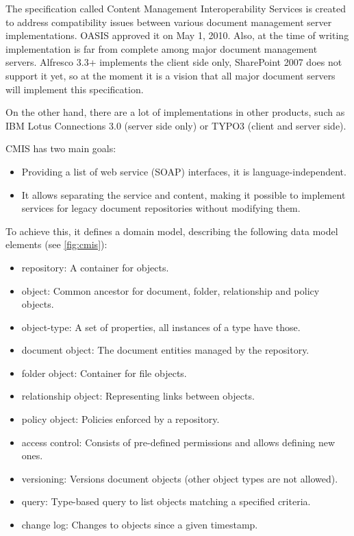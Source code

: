 The specification called Content Management Interoperability
Services \cite{cmis} is created to address compatibility issues between various
document management server implementations. OASIS approved it on May 1, 2010.
Also, at the time of writing implementation is far from complete among major
document management servers. Alfresco 3.3+ implements the client side only,
SharePoint 2007 does not support it yet, so at the moment it is a vision that
all major document servers will implement this specification.

On the other hand, there are a lot of implementations in other products, such
as IBM Lotus Connections 3.0 \cite{lotus} (server side only) or TYPO3 (client
and server side).

CMIS has two main goals:

\begin{itemize}
\item Providing a list of web service (SOAP) interfaces, it is language-independent.
\item It allows separating the service and content, making it possible to
implement services for legacy document repositories without modifying them.
\end{itemize}

To achieve this, it defines a domain model, describing the following data model
elements (see \autoref{fig:cmis}):

\begin{itemize}
\item repository: A container for objects.
\item object: Common ancestor for document, folder, relationship and policy objects.
\item object-type: A set of properties, all instances of a type have those.
\item document object: The document entities managed by the repository.
\item folder object: Container for file objects.
\item relationship object: Representing links between objects.
\item policy object: Policies enforced by a repository.
\item access control: Consists of pre-defined permissions and allows defining new ones.
\item versioning: Versions document objects (other object types are not allowed).
\item query: Type-based query to list objects matching a specified criteria.
\item change log: Changes to objects since a given timestamp.
\end{itemize}

